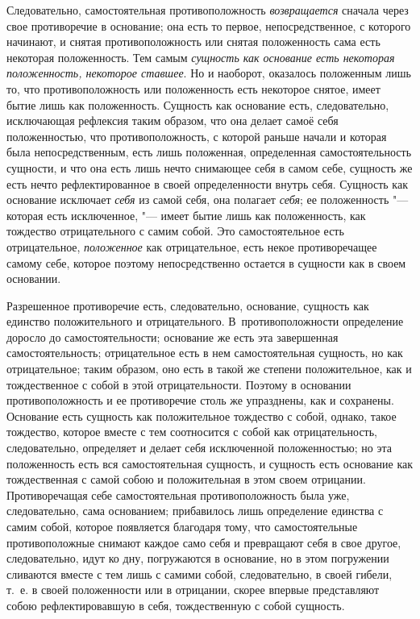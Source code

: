 Следовательно, самостоятельная противоположность
{\em возвращается} сначала через свое противоречие в
основание; она есть то первое, непосредственное, с которого начинают, и
снятая противоположность или снятая положенность сама есть некоторая
положенность. Тем самым {\em сущность как основание
есть некоторая положенность, некоторое ставшее}. Но и наоборот, оказалось
положенным лишь то, что противоположность или положенность есть некоторое
снятое, имеет бытие лишь как положенность. Сущность как основание есть,
следовательно, исключающая рефлексия таким образом, что она делает самоё
себя положенностью, что противоположность, с которой раньше начали и
которая была непосредственным, есть лишь положенная, определенная
самостоятельность сущности, и что она есть лишь нечто снимающее себя в
самом себе, сущность же есть нечто рефлектированное в своей определенности
внутрь себя. Сущность как основание исключает
{\em себя} из самой себя, она полагает
{\em себя}; ее положенность "--- которая есть исключенное,
"--- имеет бытие лишь как положенность, как тождество отрицательного с самим
собой. Это самостоятельное есть отрицательное,
{\em положенное} как отрицательное, есть некое
противоречащее самому себе, которое поэтому непосредственно остается в
сущности как в своем основании.

Разрешенное противоречие есть, следовательно, основание, сущность как
единство положительного и отрицательного. В~противоположности определение
доросло до самостоятельности; основание же есть эта завершенная
самостоятельность; отрицательное есть в нем самостоятельная сущность, но
как отрицательное; таким образом, оно есть в такой же степени
положительное, как и тождественное с собой в этой отрицательности. Поэтому
в основании противоположность и ее противоречие столь же упразднены, как и
сохранены. Основание есть сущность как положительное тождество с собой,
однако, такое тождество, которое вместе с тем соотносится с собой как
отрицательность, следовательно, определяет и делает себя исключенной
положенностью; но эта положенность есть вся самостоятельная сущность, и
сущность есть основание как тождественная с самой собою и положительная в
этом своем отрицании. Противоречащая себе самостоятельная противоположность
была уже, следовательно, сама основанием; прибавилось лишь определение
единства с самим собой, которое появляется благодаря тому, что
самостоятельные противоположные снимают каждое само себя и превращают себя
в свое другое, следовательно, идут ко дну, погружаются в основание, но в
этом погружении сливаются вместе с тем лишь с самими собой, следовательно,
в своей гибели, т.~е. в своей положенности или в отрицании, скорее впервые
представляют собою рефлектировавшую в себя, тождественную с собой сущность.

